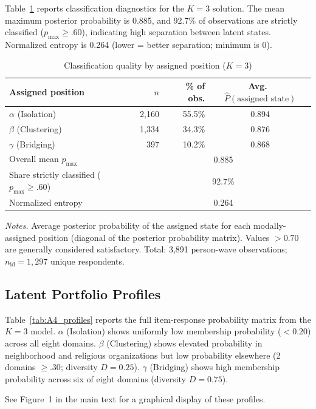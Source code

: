 \documentclass[12pt, a4paper]{article}
\newcommand{\tablenote}[1]{\vspace{4pt}\par\footnotesize\textit{Notes.} #1}
\begin{document}
Table~\ref{tab:A3_classquality} reports classification diagnostics for the
$K = 3$ solution. The mean maximum posterior probability is 0.885, and
92.7\% of observations are strictly classified ($p_{\max} \geq .60$),
indicating high separation between latent states. Normalized entropy is
0.264 (lower = better separation; minimum is 0).

\begin{table}[H]
\centering
\caption{Classification quality by assigned position ($K = 3$)}
\label{tab:A3_classquality}
\small
\begin{tabular}{lrrc}
\hline\hline
  Assigned position & $n$ & \% of obs. & Avg.\ $\hat{P}(\text{assigned state})$ \\
\hline
  $\alpha$ (Isolation)  & 2,160 & 55.5\% & 0.894 \\
  $\beta$  (Clustering) & 1,334 & 34.3\% & 0.876 \\
  $\gamma$ (Bridging)   &   397 & 10.2\% & 0.868 \\
\hline
  Overall mean $p_{\max}$                        & \multicolumn{3}{c}{0.885} \\
  Share strictly classified ($p_{\max} \geq .60$) & \multicolumn{3}{c}{92.7\%} \\
  Normalized entropy                              & \multicolumn{3}{c}{0.264} \\
\hline\hline
\end{tabular}
\tablenote{Average posterior probability of the assigned state for each
modally-assigned position (diagonal of the posterior probability matrix).
Values $> 0.70$ are generally considered satisfactory.
Total: 3,891 person-wave observations; $n_\text{id} = 1{,}297$ unique respondents.}
\end{table}

\subsection{Latent Portfolio Profiles}

Table~\ref{tab:A4_profiles} reports the full item-response probability
matrix from the $K = 3$ model. $\alpha$ (Isolation) shows uniformly low
membership probability ($< 0.20$) across all eight domains.
$\beta$ (Clustering) shows elevated probability in neighborhood and religious
organizations but low probability elsewhere (2 domains $\geq .30$;
diversity $D = 0.25$). $\gamma$ (Bridging) shows high membership probability
across six of eight domains (diversity $D = 0.75$).

See Figure~1 in the main text for a graphical display of these profiles.
\end{document}
